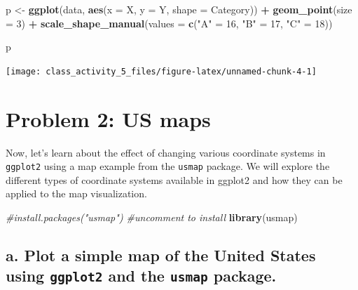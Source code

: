 \documentclass[
]{book}
\newenvironment{Shaded}{\begin{snugshade}}{\end{snugshade}}
\newcommand{\AttributeTok}[1]{\textcolor[rgb]{0.13,0.29,0.53}{#1}}
\newcommand{\CommentTok}[1]{\textcolor[rgb]{0.56,0.35,0.01}{\textit{#1}}}
\newcommand{\DecValTok}[1]{\textcolor[rgb]{0.00,0.00,0.81}{#1}}
\newcommand{\FunctionTok}[1]{\textcolor[rgb]{0.13,0.29,0.53}{\textbf{#1}}}
\newcommand{\NormalTok}[1]{#1}
\newcommand{\OtherTok}[1]{\textcolor[rgb]{0.56,0.35,0.01}{#1}}
\newcommand{\SpecialCharTok}[1]{\textcolor[rgb]{0.81,0.36,0.00}{\textbf{#1}}}
\newcommand{\StringTok}[1]{\textcolor[rgb]{0.31,0.60,0.02}{#1}}
\begin{document}
\begin{Shaded}
\begin{Highlighting}[]
\NormalTok{p }\OtherTok{\textless{}{-}} \FunctionTok{ggplot}\NormalTok{(data, }\FunctionTok{aes}\NormalTok{(}\AttributeTok{x =}\NormalTok{ X, }\AttributeTok{y =}\NormalTok{ Y, }\AttributeTok{shape =}\NormalTok{ Category)) }\SpecialCharTok{+}
  \FunctionTok{geom\_point}\NormalTok{(}\AttributeTok{size =} \DecValTok{3}\NormalTok{) }\SpecialCharTok{+}
  \FunctionTok{scale\_shape\_manual}\NormalTok{(}\AttributeTok{values =} \FunctionTok{c}\NormalTok{(}\StringTok{"A"} \OtherTok{=} \DecValTok{16}\NormalTok{, }\StringTok{"B"} \OtherTok{=} \DecValTok{17}\NormalTok{, }\StringTok{"C"} \OtherTok{=} \DecValTok{18}\NormalTok{))}

\NormalTok{p}
\end{Highlighting}
\end{Shaded}

\texttt{[image: class\_activity\_5\_files/figure-latex/unnamed-chunk-4-1]}

\hypertarget{problem-2-us-maps}{%
\section{Problem 2: US maps}\label{problem-2-us-maps}}

Now, let's learn about the effect of changing various coordinate systems in \texttt{ggplot2} using a map example from the \texttt{usmap} package. We will explore the different types of coordinate systems available in ggplot2 and how they can be applied to the map visualization.

\begin{Shaded}
\begin{Highlighting}[]
\CommentTok{\#install.packages("usmap")   \#uncomment to install}
\FunctionTok{library}\NormalTok{(usmap)}
\end{Highlighting}
\end{Shaded}

\hypertarget{a.-plot-a-simple-map-of-the-united-states-using-ggplot2-and-the-usmap-package.}{%
\subsection{\texorpdfstring{a. Plot a simple map of the United States using \texttt{ggplot2} and the \texttt{usmap} package.}{a. Plot a simple map of the United States using ggplot2 and the usmap package.}}\label{a.-plot-a-simple-map-of-the-united-states-using-ggplot2-and-the-usmap-package.}}
\end{document}
